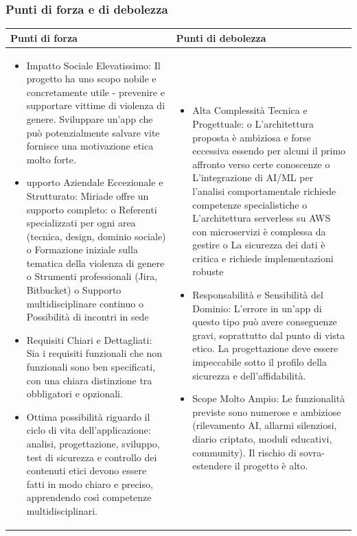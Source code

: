 \documentclass[a4paper,11pt]{article}
\begin{document}
\subsubsection{Punti di forza e di debolezza}
\begin{tabularx}{\textwidth}{|X|X|}
\hline
\rowcolor{lightgray!40} %
\textbf{Punti di forza} & \textbf{Punti di debolezza} \\
\hline
\begin{itemize}
\item Impatto Sociale Elevatissimo: Il progetto ha uno scopo nobile e concretamente utile - prevenire e supportare vittime di violenza di genere. Sviluppare un'app che può potenzialmente salvare vite fornisce una motivazione etica molto forte.

\item upporto Aziendale Eccezionale e Strutturato: Miriade offre un supporto completo:
o  	Referenti specializzati per ogni area (tecnica, design, dominio sociale)
o  	Formazione iniziale sulla tematica della violenza di genere
o  	Strumenti professionali (Jira, Bitbucket)
o  	Supporto multidisciplinare continuo
o  	Possibilità di incontri in sede
\item Requisiti Chiari e Dettagliati: Sia i requisiti funzionali che non funzionali sono ben specificati, con una chiara distinzione tra obbligatori e opzionali.
\item Ottima possibilità riguardo il ciclo di vita dell’applicazione: analisi, progettazione, sviluppo, test di sicurezza e controllo dei contenuti etici devono essere fatti in modo chiaro e preciso, apprendendo così competenze multidisciplinari.
\end{itemize}
 & \begin{itemize}
\item Alta Complessità Tecnica e Progettuale:
o	L'architettura proposta è ambiziosa e forse eccessiva essendo per alcuni il primo affronto verso certe conoscenze
o	L'integrazione di AI/ML per l'analisi comportamentale richiede competenze specialistiche
o	L'architettura serverless su AWS con microservizi è complessa da gestire
o	La sicurezza dei dati è critica e richiede implementazioni robuste

\item 	Responsabilità e Sensibilità del Dominio: L'errore in un'app di questo tipo può avere conseguenze gravi, soprattutto dal punto di vista etico. La progettazione deve essere impeccabile sotto il profilo della sicurezza e dell'affidabilità.
\item Scope Molto Ampio: Le funzionalità previste sono numerose e ambiziose (rilevamento AI, allarmi silenziosi, diario criptato, moduli educativi, community). Il rischio di sovra-estendere il progetto è alto.
\end{itemize} \\
\hline
\end{tabularx}
\end{document}
